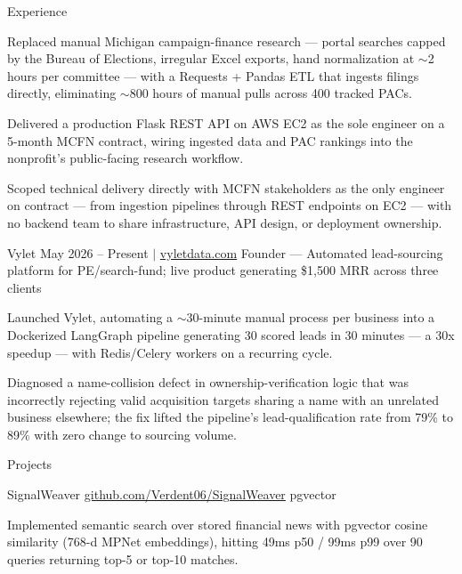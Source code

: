 \documentclass[
	11pt
]{../../../template}
\begin{document}
\begin{rSection}{E}{xperience}
\begin{rSectionEntry}
			\item Replaced manual Michigan campaign-finance research --- portal searches capped by the Bureau of Elections, irregular Excel exports, hand normalization at $\sim$2 hours per committee --- with a Requests + Pandas ETL that ingests filings directly, eliminating $\sim$800 hours of manual pulls across 400 tracked PACs.
			\item Delivered a production Flask REST API on AWS EC2 as the sole engineer on a 5-month MCFN contract, wiring ingested data and PAC rankings into the nonprofit's public-facing research workflow.
			\item Scoped technical delivery directly with MCFN stakeholders as the only engineer on contract --- from ingestion pipelines through REST endpoints on EC2 --- with no backend team to share infrastructure, API design, or deployment ownership.
		\end{rSectionEntry}

		\begin{rSectionEntry}
			{Vylet}
			{May 2026 -- Present $\vert$ \href{https://vyletdata.com}{vyletdata.com}}
			{Founder --- Automated lead-sourcing platform for PE/search-fund; live product generating \$1,500 MRR across three clients}
			{}
			{}

			\item Launched Vylet, automating a $\sim$30-minute manual process per business into a Dockerized LangGraph pipeline generating 30 scored leads in 30 minutes --- a 30x speedup --- with Redis/Celery workers on a recurring cycle.
			\item Diagnosed a name-collision defect in ownership-verification logic that was incorrectly rejecting valid acquisition targets sharing a name with an unrelated business elsewhere; the fix lifted the pipeline's lead-qualification rate from 79\% to 89\% with zero change to sourcing volume.
		\end{rSectionEntry}
	\end{rSection}

	\begin{rSection}{P}{rojects}
		\begin{rSectionEntry}
			{SignalWeaver}
			{\href{https://github.com/Verdent06/SignalWeaver}{github.com/Verdent06/SignalWeaver}}
			{}
			{pgvector}
			{}

			\item Implemented semantic search over stored financial news with pgvector cosine similarity (768-d MPNet embeddings), hitting 49ms p50 / 99ms p99 over 90 queries returning top-5 or top-10 matches.
		\end{rSectionEntry}
	\end{rSection}
\end{document}
